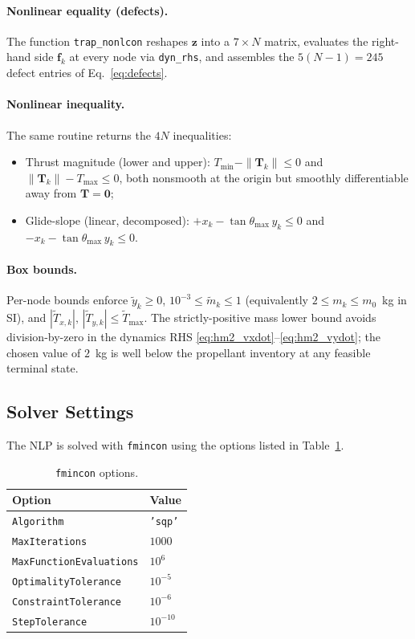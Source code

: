 \documentclass[../main.tex]{subfiles}
\begin{document}
\paragraph{Nonlinear equality (defects).} The function \texttt{trap\_nonlcon} reshapes $\mathbf{z}$ into a $7\times N$ matrix, evaluates the right-hand side $\mathbf{f}_k$ at every node via \texttt{dyn\_rhs}, and assembles the $5(N-1) = 245$ defect entries of Eq.~\eqref{eq:defects}.

\paragraph{Nonlinear inequality.} The same routine returns the $4N$ inequalities:
\begin{itemize}
    \item Thrust magnitude (lower and upper):
          $T_{\min} - \|\mathbf{T}_k\| \leq 0$ and
          $\|\mathbf{T}_k\| - T_{\max} \leq 0$, both nonsmooth at the origin but smoothly differentiable away from $\mathbf{T} = \mathbf{0}$;
    \item Glide-slope (linear, decomposed):
          $+x_k - \tan\theta_{\max}\,y_k \leq 0$ and
          $-x_k - \tan\theta_{\max}\,y_k \leq 0$.
\end{itemize}

\paragraph{Box bounds.} Per-node bounds enforce $\tilde{y}_k \geq 0$, $10^{-3} \leq \tilde{m}_k \leq 1$ (equivalently $2 \leq m_k \leq m_0$~kg in SI), and $|\tilde{T}_{x,k}|,\,|\tilde{T}_{y,k}| \leq \tilde{T}_{\max}$. The strictly-positive mass lower bound avoids division-by-zero in the dynamics RHS \eqref{eq:hm2_vxdot}--\eqref{eq:hm2_vydot}; the chosen value of $2$~kg is well below the propellant inventory at any feasible terminal state.

\subsection{Solver Settings}

The NLP is solved with \texttt{fmincon} using the options listed in Table~\ref{tab:fmincon}.

\begin{table}[H]
\centering
\caption{\texttt{fmincon} options.}
\label{tab:fmincon}
\begin{tabular}{ll}
\toprule
Option                          & Value \\
\midrule
\texttt{Algorithm}              & \texttt{'sqp'} \\
\texttt{MaxIterations}          & $1000$ \\
\texttt{MaxFunctionEvaluations} & $10^{6}$ \\
\texttt{OptimalityTolerance}    & $10^{-5}$ \\
\texttt{ConstraintTolerance}    & $10^{-6}$ \\
\texttt{StepTolerance}          & $10^{-10}$ \\
\bottomrule
\end{tabular}
\end{table}
\end{document}
